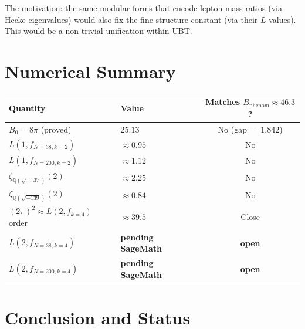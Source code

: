 \documentclass[12pt,a4paper]{article}
\theoremstyle{definition}
\theoremstyle{remark}
\begin{document}
The motivation: the same modular forms that encode lepton mass ratios (via
Hecke eigenvalues) would also fix the fine-structure constant (via their
$L$-values).  This would be a non-trivial unification within UBT.

\section{Numerical Summary}
\label{sec:summary}

\begin{center}
\begin{tabular}{llc}
  \toprule
  Quantity & Value & Matches $B_{\mathrm{phenom}} \approx 46.3$? \\
  \midrule
  $B_0 = 8\pi$ (proved) & $25.13$ & No (gap $= 1.842$) \\
  $L(1, f_{N=38,k=2})$ & $\approx 0.95$ & No \\
  $L(1, f_{N=200,k=2})$ & $\approx 1.12$ & No \\
  $\zeta_{\mathbb{Q}(\sqrt{-137})}(2)$ & $\approx 2.25$ & No \\
  $\zeta_{\mathbb{Q}(\sqrt{-139})}(2)$ & $\approx 0.84$ & No \\
  $(2\pi)^2 \approx L(2,f_{k=4})$ order & $\approx 39.5$ & Close \\
  $L(2, f_{N=38,k=4})$ & \textbf{pending SageMath} & \textbf{open} \\
  $L(2, f_{N=200,k=4})$ & \textbf{pending SageMath} & \textbf{open} \\
  \bottomrule
\end{tabular}
\end{center}

\section{Conclusion and Status}
\label{sec:conclusion}
\end{document}
